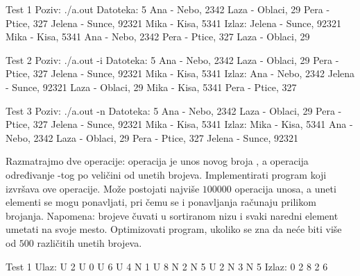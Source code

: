 \begin{Exercise}[label=513]
\begin{miditest}
\begin{test}{Test 1}
Poziv: ./a.out
Datoteka:  5
           Ana - Nebo, 2342
           Laza - Oblaci, 29
           Pera - Ptice, 327
           Jelena - Sunce, 92321
           Mika - Kisa, 5341
Izlaz:     Jelena - Sunce, 92321
           Mika - Kisa, 5341
           Ana - Nebo, 2342
           Pera - Ptice, 327
           Laza - Oblaci, 29
\end{test}
\end{miditest}
\begin{miditest}
\begin{test}{Test 2}
Poziv: ./a.out -i
Datoteka:  5
           Ana - Nebo, 2342
           Laza - Oblaci, 29
           Pera - Ptice, 327
           Jelena - Sunce, 92321
           Mika - Kisa, 5341
Izlaz:     Ana - Nebo, 2342
           Jelena - Sunce, 92321
           Laza - Oblaci, 29
           Mika - Kisa, 5341
           Pera - Ptice, 327
\end{test}
\end{miditest}

\begin{miditest}
\begin{test}{Test 3}
Poziv: ./a.out -n
Datoteka:  5
           Ana - Nebo, 2342
           Laza - Oblaci, 29
           Pera - Ptice, 327
           Jelena - Sunce, 92321
           Mika - Kisa, 5341
Izlaz:     Mika - Kisa, 5341
           Ana - Nebo, 2342
           Laza - Oblaci, 29
           Pera - Ptice, 327
           Jelena - Sunce, 92321		   
\end{test}
\end{miditest}
\end{Exercise}
\begin{Exercise}[difficulty=2, label=514]
  Razmatrajmo dve operacije: operacija  je unos novog broja
  , a operacija  određivanje -tog po
  veličini od unetih brojeva. Implementirati program koji izvršava ove
  operacije. Može postojati najviše $100000$ operacija unosa, a uneti
  elementi se mogu ponavljati, pri čemu se i ponavljanja računaju
  prilikom brojanja. Napomena: brojeve čuvati u sortiranom nizu i
  svaki naredni element umetati na svoje mesto. Optimizovati program,
  ukoliko se zna da neće biti više od $500$ različitih unetih brojeva.
  
\begin{maxitest}
\begin{test}{Test 1}
Ulaz: U 2 U 0 U 6 U 4 N 1 U 8 N 2 N 5 U 2 N 3 N 5
Izlaz: 0 2 8 2 6
\end{test}
\end{maxitest}
  
\end{Exercise}

